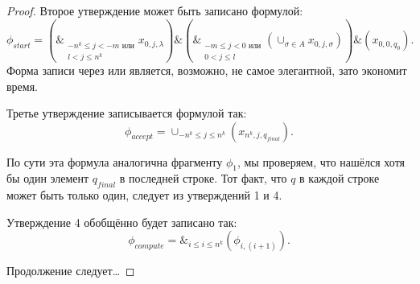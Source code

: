 \begin{proof}
Второе утверждение может быть записано формулой:
\[
	\phi_{start} = \left( \&_{\substack{-n^k\le j < -m \text{ или} \\ l<j\le n^k}} x_{0,j,\lambda} \right) \& 
	\left( \&_{\substack{-m\le  j < 0 \text{ или}\\ 0<j\le l}}
	\left(\cup_{\sigma \in A} x_{0,j,\sigma}\right) \right) \& 
	\left( x_{0,0,q_0} \right) 
.\] 
Форма записи через или является, возможно, не самое элегантной, зато экономит
время.

Третье утверждение записывается формулой так:
\[
	\phi_{accept} = \cup_{-n^k\le j\le n^k} (x_{n^k, j, q_{final}})
.\] 

По сути эта формула аналогична фрагменту $\phi_1$, мы проверяем, что нашёлся
хотя бы один элемент $q_{final}$ в последней строке. Тот факт, что $q$ в каждой
строке может быть только один, следует из утверждений 1 и 4.

Утверждение 4 обобщённо будет записано так:
 \[
	 \phi_{compute} =  \&_{i\le i\le n^k} (\phi_{i, (i+1)})
.\]

Продолжение следует\ldots
\end{proof}


